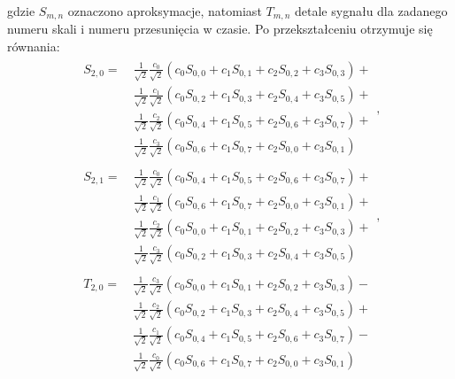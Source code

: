 gdzie $S_{m,n}$ oznaczono aproksymacje, natomiast $T_{m,n}$ detale sygnału dla zadanego numeru skali i numeru przesunięcia w czasie. Po przekształceniu otrzymuje się równania:
\begin{gather}
\begin{split}
S_{2,0} =~
	& \frac{1}{\sqrt{2}} \frac{c_{0}}{\sqrt{2}} \left( c_{0} S_{0,0} + c_{1} S_{0,1} + c_{2} S_{0,2} + c_{3} S_{0,3} \right) + \\
	& \frac{1}{\sqrt{2}} \frac{c_{1}}{\sqrt{2}} \left( c_{0} S_{0,2} + c_{1} S_{0,3} + c_{2} S_{0,4} + c_{3} S_{0,5} \right) + \\
	& \frac{1}{\sqrt{2}} \frac{c_{2}}{\sqrt{2}} \left( c_{0} S_{0,4} + c_{1} S_{0,5} + c_{2} S_{0,6} + c_{3} S_{0,7} \right) + \\
	& \frac{1}{\sqrt{2}} \frac{c_{3}}{\sqrt{2}} \left( c_{0} S_{0,6} + c_{1} S_{0,7} + c_{2} S_{0,0} + c_{3} S_{0,1} \right)
\end{split}
\label{eq:db2_outvect_s_2_0_rek}, \\
\begin{split}
S_{2,1} =~
	& \frac{1}{\sqrt{2}} \frac{c_{0}}{\sqrt{2}} \left( c_{0} S_{0,4} + c_{1} S_{0,5} + c_{2} S_{0,6} + c_{3} S_{0,7} \right) + \\
	& \frac{1}{\sqrt{2}} \frac{c_{1}}{\sqrt{2}} \left( c_{0} S_{0,6} + c_{1} S_{0,7} + c_{2} S_{0,0} + c_{3} S_{0,1} \right) + \\
	& \frac{1}{\sqrt{2}} \frac{c_{2}}{\sqrt{2}} \left( c_{0} S_{0,0} + c_{1} S_{0,1} + c_{2} S_{0,2} + c_{3} S_{0,3} \right) + \\
	& \frac{1}{\sqrt{2}} \frac{c_{3}}{\sqrt{2}} \left( c_{0} S_{0,2} + c_{1} S_{0,3} + c_{2} S_{0,4} + c_{3} S_{0,5} \right)
\end{split}
\label{eq:db2_outvect_s_2_1_rek}, \\
\begin{split}
T_{2,0} =~
	& \frac{1}{\sqrt{2}} \frac{c_{3}}{\sqrt{2}} \left( c_{0} S_{0,0} + c_{1} S_{0,1} + c_{2} S_{0,2} + c_{3} S_{0,3} \right) - \\
	& \frac{1}{\sqrt{2}} \frac{c_{2}}{\sqrt{2}} \left( c_{0} S_{0,2} + c_{1} S_{0,3} + c_{2} S_{0,4} + c_{3} S_{0,5} \right) + \\
	& \frac{1}{\sqrt{2}} \frac{c_{1}}{\sqrt{2}} \left( c_{0} S_{0,4} + c_{1} S_{0,5} + c_{2} S_{0,6} + c_{3} S_{0,7} \right) - \\
	& \frac{1}{\sqrt{2}} \frac{c_{0}}{\sqrt{2}} \left( c_{0} S_{0,6} + c_{1} S_{0,7} + c_{2} S_{0,0} + c_{3} S_{0,1} \right)
\end{split}

\end{gather}

